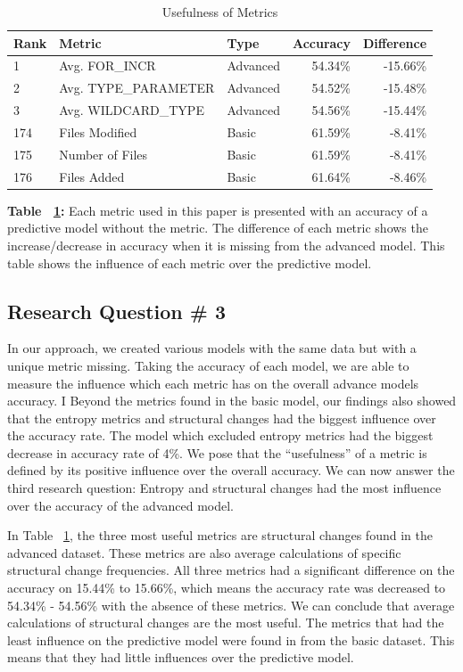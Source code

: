 \documentclass[10pt, conference]{IEEEtran}
\begin{document}
\begin{table}[h!]
  \centering
  \caption{Usefulness of Metrics}
  \label{figureUsefulness}
  \begin{tabular}{p{0.5cm} l | l r r}
    \toprule
    \textbf{Rank}&\textbf {Metric} & \textbf{Type} & \textbf{Accuracy} & \textbf{Difference}\\ %
    \midrule
    1 & Avg. FOR\_INCR & Advanced & 54.34\% & -15.66\%\\ %
    2 &  Avg. TYPE\_PARAMETER & Advanced & 54.52\% & -15.48\%\\ %
    3 & Avg. WILDCARD\_TYPE & Advanced & 54.56\% & -15.44\%\\  %
     174 & Files Modified & Basic & 61.59\% & -8.41\%\\ %
     175 & Number of Files & Basic & 61.59\% & -8.41\%\\%
     176 & Files Added & Basic & 61.64\% & -8.46\%\\  %
    \bottomrule
  \end{tabular}
  \break
  \break
\textbf{Table ~\ref{figureUsefulness}:} Each metric used in this paper is presented with an accuracy of a predictive model without the metric. The difference of each metric shows the increase/decrease in accuracy when it is missing from the advanced model. This table shows the influence of each metric over the predictive model.
\end{table}

\subsection{Research Question \# 3}
In our approach, we created various models with the same data but with a unique metric missing. Taking the accuracy of each model, we are able to measure the influence which each metric has on the overall advance model\textquotesingle s accuracy. I Beyond the metrics found in the basic model, our findings also showed that the entropy metrics and structural changes had the biggest influence over the accuracy rate. The model which excluded entropy metrics had the biggest decrease in accuracy rate of 4\%. We pose that the \enquote{usefulness} of a metric is defined by its positive influence over the overall accuracy. We can now answer the third research question: Entropy and structural changes had the most influence over the accuracy of the advanced model. 

In Table ~\ref{figureUsefulness}, the three most useful metrics are structural changes found in the advanced dataset. These metrics are also average calculations of specific structural change frequencies. All three metrics had a significant difference on the accuracy on 15.44\% to 15.66\%, which means the accuracy rate was decreased to 54.34\% - 54.56\% with the absence of these metrics. We can conclude that average calculations  of structural changes are the most useful. The metrics that had the least influence on the predictive model were found in from the basic dataset. This means that they had little influences over the predictive model.
\end{document}
